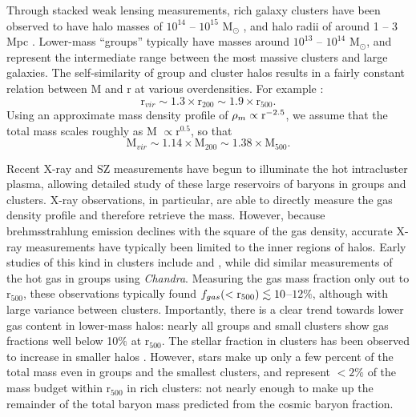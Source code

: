 Through stacked weak lensing measurements, rich galaxy clusters have
been observed to have halo masses of $10^{14}$ -- $10^{15} $ M$_\odot$
\citep{Mandelbaum2008}, and halo radii of around 1 -- 3 Mpc
\citep{Vikhlinin2006}. Lower-mass ``groups'' typically have masses
around $10^{13}$ -- $10^{14}$ M$_\odot$, and represent the
intermediate range between the most massive clusters and large
galaxies. The self-similarity of group and cluster halos results in a
fairly constant relation between M and r at various overdensities. For
example \citep{Rasheed2011}:
\begin{equation}
\textrm{r}_{vir} \sim 1.3\times{}\textrm{r}_{200} \sim
1.9\times{}\textrm{r}_{500}.
\end{equation}
Using an approximate mass density profile of $\rho_m \propto
\textrm{r}^{-2.5}$, we assume that the total mass scales roughly as
M $\propto \textrm{r}^{0.5}$, so that
\begin{equation}
\textrm{M}_{vir} \sim 1.14\times{}\textrm{M}_{200} \sim 1.38 \times{}\textrm{M}_{500}.
\end{equation}

Recent X-ray and SZ measurements have begun to illuminate the hot
intracluster plasma, allowing detailed study of these large reservoirs
of baryons in groups and clusters. X-ray observations, in particular,
are able to directly measure the gas density profile and therefore
retrieve the mass. However, because brehmsstrahlung emission declines
with the square of the gas density, accurate X-ray measurements have
typically been limited to the inner regions of halos. Early studies of
this kind in clusters include \citet[][with
  \textit{Chandra}]{Vikhlinin2006} and \citet[][with
  \textit{XMM-Newton}]{Arnaud2007}, while \citet{Sun2009} did similar
measurements of the hot gas in groups using
\textit{Chandra}. Measuring the gas mass fraction only out to
r$_{500}$, these observations typically found
$f_{gas}(<\textrm{r}_{500}) \lesssim 10$--$12\%$, although with large
variance between clusters. Importantly, there is a clear trend towards
lower gas content in lower-mass halos: nearly all groups and small
clusters show gas fractions well below 10$\%{}$ at
r$_{500}$.  The
stellar fraction in clusters has been observed to increase in smaller
halos \citep{Giodini2009, Bahcall2014}. However, stars make up only a
few percent of the total mass even in groups and the smallest
clusters, and represent $<2\%$ of the mass budget within r$_{500}$ in
rich clusters: not nearly enough to make up the remainder of the
total baryon mass predicted from the cosmic baryon fraction.

